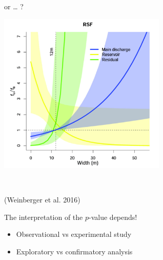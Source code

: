 \documentclass[
  10pt,
  ignorenonframetext,
]{beamer}
\providecommand{\tightlist}{%
  \setlength{\itemsep}{0pt}\setlength{\parskip}{0pt}}
\begin{document}
\begin{frame}
or \ldots{} ?

\centering\includegraphics[width=0.6\textwidth,height=\textheight]{graphics/weinberger.png}

\(~\)

\flushleft
\scriptsize

(Weinberger et al. 2016)
\end{frame}

\begin{frame}
\begin{block}{The interpretation of the \(p\)-value depends!}
\protect\hypertarget{the-interpretation-of-the-p-value-depends}{}
\(~\)

\begin{itemize}
\tightlist
\item
  Observational vs experimental study
\end{itemize}

\vspace{2mm}

\begin{itemize}
\tightlist
\item
  Exploratory vs confirmatory analysis
\end{itemize}
\end{block}
\end{frame}
\end{document}
